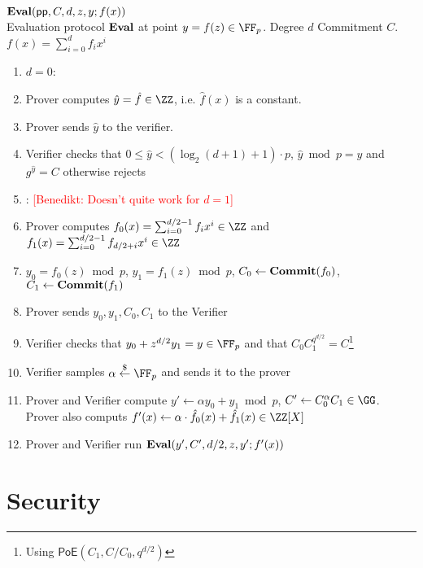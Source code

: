 \documentclass{article}
\newcommand{\benedikt}[1]{{\textcolor{red}{[Benedikt: #1]}}}
\newcommand{\benedikt}[1]{}
\begin{document}
\begin{small}
 \begin{minipage}{1.1\textwidth}
\begin{mdframed}[userdefinedwidth=1\textwidth]  \label{prot:Opening}
$\textbf{{Eval}}(\textsf{pp},C,d,z,y;f(x))$\\
Evaluation protocol $\textbf{{Eval}}$ at point $y=f(z)\in \FF_p$. Degree $d$ Commitment $C$. $f(x)=\sum_{i=0}^{d} f_i x^{i}$
\begin{enumerate}[nolistsep]
\item \pcif $d=0$:
\item \pcind[1] Prover computes $\hat{y}=\hat{f} \in \ZZ$, i.e. $\hat{f}(x)$ is a constant. 
\item \pcind[1] Prover sends $\hat{y}$ to the verifier.
\item \pcind[1] Verifier checks that $0\leq\hat{y}< (\log_2(d+1)+1)\cdot p$,  $\hat{y} \bmod p=y$ and $g^{\hat{y}}=C$ otherwise rejects
\item \pcelse: \benedikt{Doesn't quite work for $d=1$}
\item \pcind[1] Prover computes $f_0(x)=\sum_{i=0}^{d/2-1} f_i x^i\in \ZZ$ and $f_1(x)=\sum_{i=0}^{d/2-1} f_{d/2+i} x^{i}\in \ZZ$
\item \pcind[1] $y_0=f_0(z) \bmod p$, $y_1=f_1(z)\bmod p$, $C_0\gets\textbf{{Commit}}(f_0)$,$C_1\gets\textbf{{Commit}}(f_1)$
\item \pcind[1] Prover sends $y_0,y_1,C_0,C_1$ to the Verifier
\item \pcind[1] Verifier checks that $y_0+z^{d/2} y_1=y\in \FF_p$ and that $C_0C_1^{q^{d/2}}=C$\footnote{Using $\textsf{PoE}(C_1,C/C_0,q^{d/2})$}
\item \pcind[1] Verifier samples $\alpha \sample \FF_p$ and sends it to the prover
\item \pcind[1] Prover and Verifier compute $y'\gets\alpha y_0 +y_1 \bmod p$, $C'\gets C_0^{\alpha}C_1 \in \GG$. \\Prover also computs $f'(x)\gets\alpha  \cdot \hat{f}_0(x)+\hat{f}_1(x) \in \ZZ[X]$ 
\item \pcind[1] Prover and Verifier run $\textbf{{Eval}}(y',C',d/2,z,y';f'(x))$
\end{enumerate}
\end{mdframed}
\end{minipage}
\end{small}

\section{Security}
\end{document}
